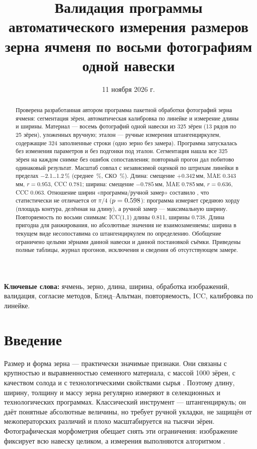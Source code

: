 \documentclass[12pt,a4paper]{article}
\title{Валидация программы автоматического измерения размеров зерна ячменя
по восьми фотографиям одной навески}
\author{}
\date{11 ноября 2026 г.}
\begin{document}
\maketitle

\begin{abstract}
\noindent
Проверена разработанная автором программа пакетной обработки фотографий
зерна ячменя: сегментация зёрен, автоматическая калибровка по линейке и
измерение длины и ширины. Материал — восемь фотографий одной навески из
325 зёрен (13 рядов по 25 зёрен), уложенных вручную; эталон — ручные
измерения штангенциркулем, содержащие 324 заполненные строки (одно зерно
без замера). Программа запускалась без изменения параметров и без подгонки
под эталон. Сегментация нашла все 325 зёрен на каждом снимке без ошибок
сопоставления; повторный прогон дал побитово одинаковый результат.
Масштаб совпал с независимой оценкой по штрихам линейки в пределах
\num{-2.1}\ldots\num{+1.2}\,\% (среднее \CalMean\,\%, СКО \CalSd\,\%).
Длина: смещение $+\num{0.342}$\,мм, MAE \num{0.343}\,мм, $r = \num{0.953}$,
CCC \num{0.781}; ширина: смещение $-\num{0.785}$\,мм, MAE \num{0.785}\,мм,
$r = \num{0.636}$, CCC \num{0.063}. Отношение ширин
«программа/ручной замер» составило \WidRatio, что статистически не
отличается от $\pi/4$ ($p = \num{0.598}$): программа измеряет среднюю хорду
(площадь контура, делённая на длину), а ручной замер — максимальную ширину.
Повторяемость по восьми снимкам: ICC(1,1) длины \num{0.811}, ширины
\num{0.738}. Длина пригодна для ранжирования, но абсолютные значения не
взаимозаменяемы; ширина в текущем виде несопоставима со
штангенциркулем по определению. Обобщение ограничено
целыми зёрнами данной навески и данной постановкой съёмки. Приведены
полные таблицы, журнал прогонов, исключения и сведения об отсутствующем
замере.
\end{abstract}

\noindent\textbf{Ключевые слова:} ячмень, зерно, длина, ширина,
обработка изображений, валидация, согласие методов, Блэнд--Альтман,
повторяемость, ICC, калибровка по линейке.

\section{Введение}

Размер и форма зерна — практически значимые признаки. Они связаны с
крупностью и выравненностью семенного материала, с массой 1000 зёрен, с
качеством солода и с технологическими свойствами сырья
\cite{symons1988,tanabata2012}. Поэтому длину, ширину, толщину и массу
зерна регулярно измеряют в селекционных и технологических программах.
Классический инструмент — штангенциркуль; он даёт понятные абсолютные
величины, но требует ручной укладки, не защищён от межоператорских
различий и плохо масштабируется на тысячи зёрен. Фотографическая
морфометрия обещает снять эти ограничения: изображение фиксирует всю
навеску целиком, а измерения выполняются алгоритмом
\cite{li2014,igathinathane2008,sankaran2016,gao2017}.
\end{document}
